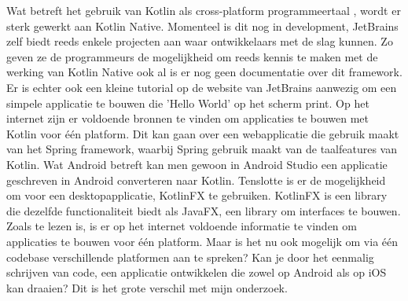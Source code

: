 	\newline
	\newline
	Wat betreft het gebruik van Kotlin als cross-platform programmeertaal \autocite{dzone}, wordt er sterk gewerkt aan Kotlin Native. Momenteel is dit nog in development, JetBrains zelf biedt reeds enkele projecten aan waar ontwikkelaars met de slag kunnen. Zo geven ze de programmeurs de mogelijkheid om reeds kennis te maken met de werking van Kotlin Native ook al is er nog geen documentatie over dit framework. Er is echter ook een kleine tutorial op de website van JetBrains aanwezig om een simpele applicatie te bouwen die 'Hello World' op het scherm print.
	\newline
	\newline
	Op het internet zijn er voldoende bronnen te vinden om applicaties te bouwen met Kotlin voor één platform. Dit kan gaan over een webapplicatie die gebruik maakt van het Spring framework, waarbij Spring gebruik maakt van de taalfeatures van Kotlin. Wat Android betreft kan men gewoon in Android Studio een applicatie geschreven in Android converteren naar Kotlin. Tenslotte is er de mogelijkheid om voor een desktopapplicatie, KotlinFX te gebruiken. KotlinFX is een library die dezelfde functionaliteit biedt als JavaFX, een library om interfaces te bouwen.
	\newline
	\newline
	Zoals te lezen is, is er op het internet voldoende informatie te vinden om applicaties te bouwen voor één platform. Maar is het nu ook mogelijk om via één codebase verschillende platformen aan te spreken? Kan je door het eenmalig schrijven van code, een applicatie ontwikkelen die zowel op Android als op iOS kan draaien? Dit is het grote verschil met mijn onderzoek.
	
	
	
